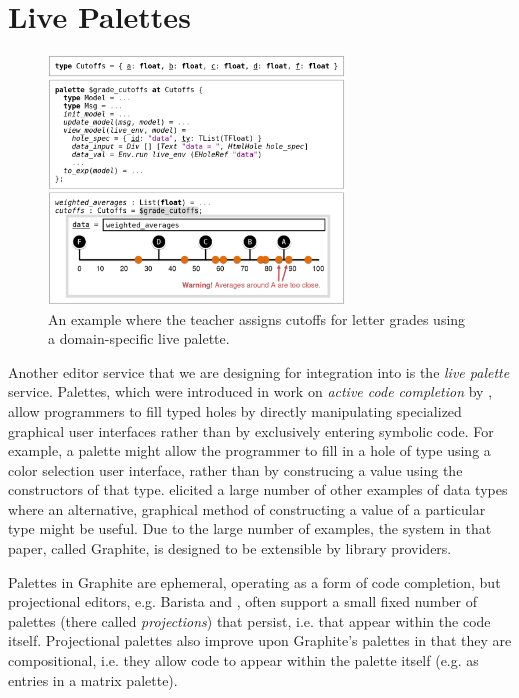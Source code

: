 
\section{Live Palettes}
\label{sec:palettes}


\begin{figure}[t]
\vspace{-4px}
\includegraphics[width=0.7\textwidth]{images/cutoffs-new.png}
\caption{An example where the teacher assigns cutoffs 
for letter grades using a domain-specific live palette.}
\label{fig:cutoffs-example}
\vspace{-4px}
\end{figure}

Another editor service that we are designing for integration into \Hazel 
is the \emph{live palette} service. 
Palettes, which were introduced in work on
\emph{active code completion} by \citet{ActiveCodeCompletion},  allow programmers to fill typed 
holes by directly manipulating specialized graphical user interfaces rather than by exclusively entering symbolic
code. For example, a palette might allow the programmer to 
fill in a hole of type  using a color selection  
user interface, rather than by construcing a  value  
using the constructors of that type. \citet{ActiveCodeCompletion} elicited a large number of other
examples of data types where an alternative, graphical 
method of constructing a value of a particular type might be
useful. Due to the large number of examples, the system in that paper, called {Graphite}, is designed to be extensible by library providers. 

Palettes in {Graphite} 
are ephemeral, operating as a form of code completion, but projectional editors, e.g. Barista \cite{ko_barista:_2006} and  \cite{voelter_mbeddr:_2012}, often support a small fixed number of  
palettes (there called \emph{projections}) that persist, i.e. that appear within the code itself. 
Projectional palettes also improve upon Graphite's palettes in that they are compositional, i.e. they allow code to appear within the palette itself (e.g. as entries in a matrix palette). 

